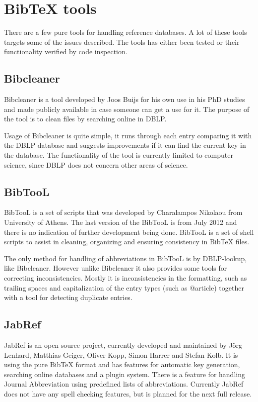 \section{Bib{\TeX} tools}
\label{sec:bibtex_tools}
There are a few pure {\bibtex} tools for handling reference databases.
A lot of these tools targets some of the issues described.  The tools
has either been tested or their functionality verified by code
inspection.

\subsection{Bibcleaner}
Bibcleaner is a tool developed by Joos Buijs for his own use in his
PhD studies and made publicly available in case someone can get a use
for it.  The purpose of the tool is to clean {\bibtex} files by
searching online in DBLP\cite{bibcleaner_question, bibcleaner_source}.

Usage of Bibcleaner is quite simple, it runs through each entry
comparing it with the DBLP database and suggests improvements if it
can find the current key in the database.  The functionality of the
tool is currently limited to computer science, since DBLP does not
concern other areas of science\cite{bibcleaner_source}.

\subsection{BibTooL}
BibTooL is a set of {\bibtex} scripts that was developed by
Charalampos Nikolaou from University of Athens.  The last version of
the BibTooL is from July 2012 and there is no indication of further
development being done.  BibTooL is a set of shell scripts to assist
in cleaning, organizing and ensuring consistency in Bib{\TeX}
files\cite{bibtool_site}.

The only method for handling of abbreviations in BibTooL is by
DBLP-lookup, like Bibcleaner.  However unlike Bibcleaner it also
provides some tools for correcting inconsistencies.  Mostly it is
inconsistencies in the formatting, such as trailing spaces and
capitalization of the entry types (such as @article) together with a
tool for detecting duplicate entries.

\subsection{JabRef}
JabRef is an open source project, currently developed and maintained
by Jörg Lenhard, Matthias Geiger, Oliver Kopp, Simon Harrer and Stefan
Kolb\cite{jabref_developers}.  It is using the pure Bib{\TeX} format
and has features for automatic key generation, searching online
databases and a plugin system\cite{jabref_features}.  There is a
feature for handling Journal Abbreviation using predefined lists of
abbreviations\cite{jabref_abbreviations}.  Currently JabRef does not
have any spell checking features, but is planned for the next full
release\cite{jabref_spellchecker}.

